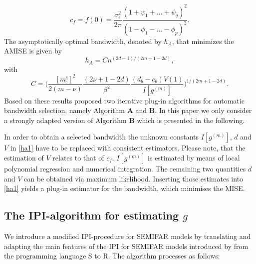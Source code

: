 \documentclass[12pt]{article}
\begin{document}
\begin{equation}
	c_f = f(0) = \frac{\sigma^2_\epsilon}{2\pi} \frac{(1 + \psi_1+\dots+\psi_q)^2}{(1-\phi_1-\dots-\phi_p)^2}.
\end{equation}
 The asymptotically optimal bandwidth, denoted by $h_A$, that minimizes the AMISE is given by
\begin{equation}
	\label{ha1}
h_A=Cn^{(2d-1)/(2m+1-2d)},
\end{equation}
with 
\begin{equation}
\label{ha2}
C=\Bigg(\frac{[m!]^2}{2(m-\nu)} \frac{(2\nu+1-2d)}{\beta^2}\frac{(d_b - c_b)V(1)}{I[g^{(m)}]}\Bigg)^{1/(2m+1-2d)}.
\end{equation}
Based on these results \citet{beran2002iterative} proposed two iterative plug-in algorithms for automatic bandwidth selection, namely Algorithm \textbf{A} and \textbf{B}. In this paper we only consider a strongly adapted version of Algorithm \textbf{B} which is presented in the following.

  
In order to obtain a selected bandwidth the unknown constants $I[g^{(m)}]$, $d$ and $V$ in \eqref{ha1} have to be replaced with consistent estimators. Please note, that the estimation of $V$ relates to that of $c_f$. $I[g^{(m)}]$ is estimated by means of local polynomial regression and numerical integration. The remaining two quantities $d$ and $V$ can be obtained via maximum likelihood. Inserting those estimates into \eqref{ha1} yields a plug-in estimator for the bandwidth, which minimises the MISE.

\subsection{The IPI-algorithm for estimating $g$}

We introduce a modified IPI-procedure for SEMIFAR models by translating and adapting the main features of the IPI for SEMIFAR models introduced by \citet{beran2002iterative} from the programming language S to R. The algorithm processes as follows:
\end{document}
